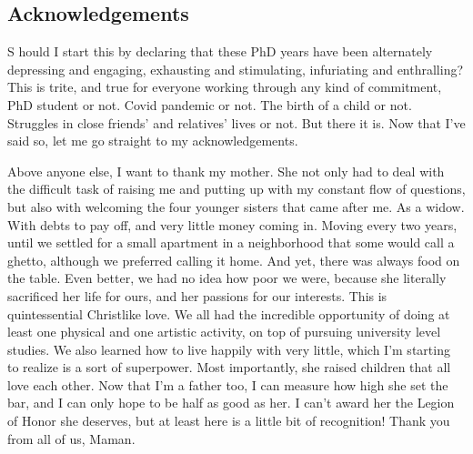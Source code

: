 
{}

\vspace*{-1.6cm}
\begin{flushright}
\section*{\fontsize{20pt}{20pt}\selectfont\textnormal{Acknowledgements}}
\end{flushright}
\vspace{-0.2cm}


\chead[\fancyplain{}{}]
      {\fancyplain{}{}}
\lfoot[\fancyplain{}{}]
      {\fancyplain{}{}}
\cfoot[\fancyplain{}{\thepage}]
      {\fancyplain{}{\thepage}}
\rfoot[\fancyplain{}{}]%
     {\fancyplain{}{\scriptsize}}


\lettrine[lines=1]{S}{ } hould I start this by declaring that these PhD years have been alternately depressing and engaging, exhausting and stimulating, infuriating and enthralling? This is trite, and true for everyone working through any kind of commitment, PhD student or not. Covid pandemic or not.  The birth of a child or not. Struggles in close friends’ and relatives’ lives or not. But there it is. Now that I’ve said so, let me go straight to my acknowledgements.

Above anyone else, I want to thank my mother. She not only had to deal with the difficult task of raising me and putting up with my constant flow of questions, but also with welcoming the four younger sisters that came after me. As a widow. With debts to pay off, and very little money coming in. Moving every two years, until we settled for a small apartment in a neighborhood that some would call a ghetto, although we preferred calling it home. And yet, there was always food on the table. Even better, we had no idea how poor we were, because she literally sacrificed her life for ours, and her passions for our interests. This is quintessential Christlike love. We all had the incredible opportunity of doing at least one physical and one artistic activity, on top of pursuing university level studies. We also learned how to live happily with very little, which I’m starting to realize is a sort of superpower. Most importantly, she raised children that all love each other. Now that I’m a father too, I can measure how high she set the bar, and I can only hope to be half as good as her. I can’t award her the Legion of Honor she deserves, but at least here is a little bit of recognition! Thank you from all of us, Maman.

